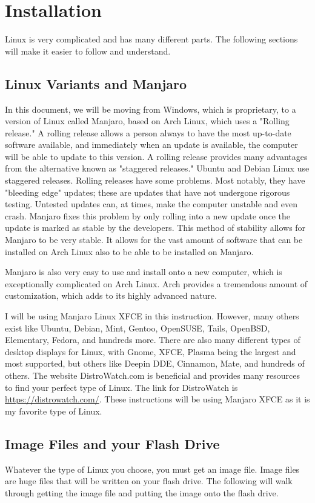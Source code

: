 \documentclass{article}
\begin{document}
\section{Installation}
Linux is very complicated and has many different parts. The following sections will make it easier to follow and understand.

\subsection{Linux Variants and Manjaro}
In this document, we will be moving from Windows, which is proprietary, to a version of Linux called Manjaro, based on Arch Linux, which uses a "Rolling release." A rolling release allows a person always to have the most up-to-date software available, and immediately when an update is available, the computer will be able to update to this version. A rolling release provides many advantages from the alternative known as "staggered releases." Ubuntu and Debian Linux use staggered releases. Rolling releases have some problems. Most notably, they have "bleeding edge" updates; these are updates that have not undergone rigorous testing. Untested updates can, at times, make the computer unstable and even crash. Manjaro fixes this problem by only rolling into a new update once the update is marked as stable by the developers. This method of stability allows for Manjaro to be very stable. It allows for the vast amount of software that can be installed on Arch Linux also to be able to be installed on Manjaro.  


Manjaro is also very easy to use and install onto a new computer, which is exceptionally complicated on Arch Linux. Arch provides a tremendous amount of customization, which adds to its highly advanced nature. 

I will be using Manjaro Linux XFCE in this instruction. However, many others exist like Ubuntu, Debian, Mint, Gentoo, OpenSUSE, Tails, OpenBSD, Elementary, Fedora, and hundreds more. There are also many different types of desktop displays for Linux, with Gnome, XFCE, Plasma being the largest and most supported, but others like Deepin DDE, Cinnamon, Mate, and hundreds of others. The website DistroWatch.com is beneficial and provides many resources to find your perfect type of Linux. The link for DistroWatch is \url{https://distrowatch.com/}. These instructions will be using Manjaro XFCE as it is my favorite type of Linux.


\subsection{Image Files and your Flash Drive}\label{imageFile}
Whatever the type of Linux you choose, you must get an image file. Image files are huge files that will be written on your flash drive. The following will walk through getting the image file and putting the image onto the flash drive.
\end{document}
